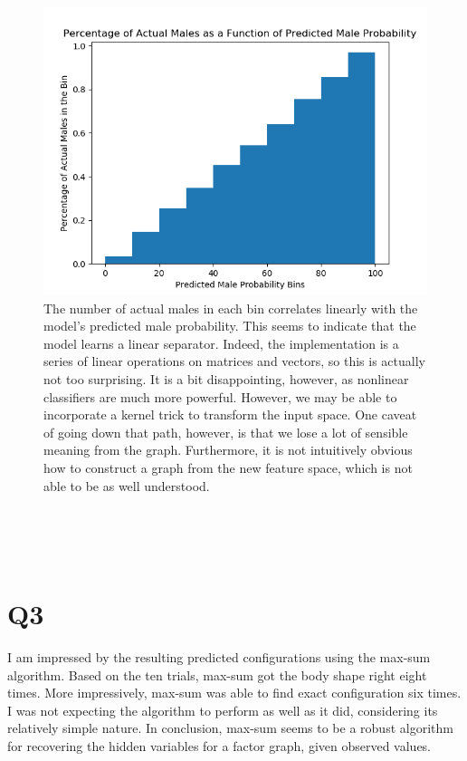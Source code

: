 \documentclass{article}
\begin{document}
\begin{figure}[!ht]
	\centering
	\includegraphics[width=120mm]{figs/Q2.png}
	\caption{The number of actual males in each bin correlates linearly with the 
        model's predicted male probability. This seems to indicate that 
        the model learns a linear separator. Indeed, the implementation is a 
        series of linear operations on matrices and vectors, so this is actually 
        not too surprising. It is a bit disappointing, however, as nonlinear 
        classifiers are much more powerful. However, we may be able to 
        incorporate a kernel trick to transform the input space. One caveat of 
        going down that path, however, is that we lose a lot of sensible meaning 
        from the graph. Furthermore, it is not intuitively obvious how to 
        construct a graph from the new feature space, which is not able to be 
        as well understood. }
\end{figure}

~\\
~\\
~\\

\section{Q3}

I am impressed by the resulting predicted configurations using the max-sum 
algorithm. Based on the ten trials, max-sum got the body shape right eight 
times. More impressively, max-sum was able to find exact configuration six 
times. I was not expecting the algorithm to perform as well as it did, 
considering its relatively simple nature. In conclusion, max-sum seems to be 
a robust algorithm for recovering the hidden variables for a factor graph, given 
observed values.
\end{document}
